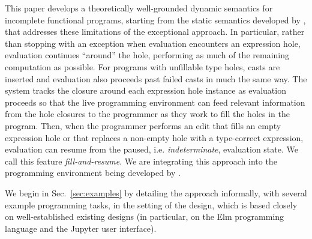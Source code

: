 
This paper develops a theoretically well-grounded dynamic semantics for incomplete functional programs, starting from the static semantics developed by \citet{popl-paper},  that addresses these limitations of the exceptional approach. 
In particular, rather than stopping with an exception when evaluation encounters an expression hole, evaluation continues ``around'' the hole, performing as much of the remaining computation as possible. 
For programs with unfillable type holes, casts are inserted and evaluation also proceeds past failed casts in much the same way. 
The system tracks the closure around each expression hole instance as evaluation proceeds so that 
the live programming environment can feed relevant information from the {hole closures} to the programmer as they work to fill the holes in the program.
Then, when the programmer performs an edit that fills an empty expression hole or that replaces a non-empty hole with a type-correct expression, evaluation can resume from the paused, i.e. \emph{indeterminate}, evaluation state. We call this feature \emph{fill-and-resume}. We are integrating this approach into the \Hazel programming environment being developed by \citet{HazelnutSNAPL}. 


\newcommand{\contribution}[2]{\paragraph{#1. #2}} 


We begin in Sec.~\ref{sec:examples} by detailing the approach informally, with several example programming tasks, in the setting of the \Hazel design, which is based closely on well-established existing designs (in particular, on the Elm programming language and the Jupyter user interface). 

